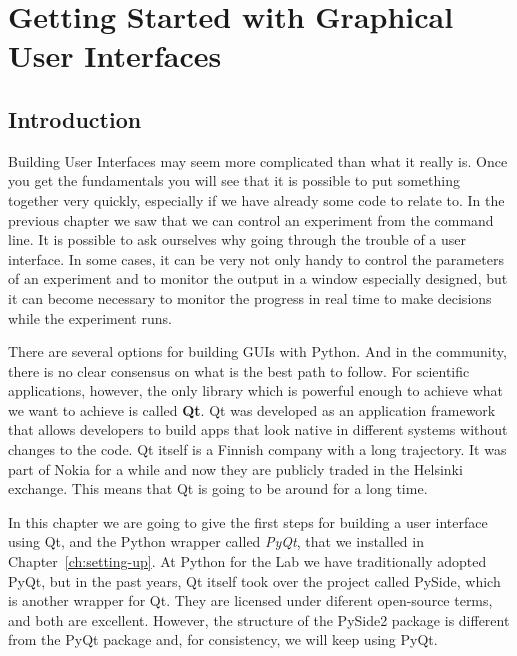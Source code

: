 \chapter{Getting Started with Graphical User Interfaces}\label{ch:gui}

\section{Introduction}\label{sec:gui-introduction}
Building User Interfaces may seem more complicated than what it really is. Once you get the fundamentals you will see that it is possible to put something together very quickly, especially if we have already some code to relate to. In the previous chapter we saw that we can control an experiment from the command line. It is possible to ask ourselves why going through the trouble of a user interface. In some cases, it can be very not only handy to control the parameters of an experiment and to monitor the output in a window especially designed, but it can become necessary to monitor the progress in real time to make decisions while the experiment runs.

There are several options for building GUIs with Python. And in the community, there is no clear consensus on what is the best path to follow. For scientific applications, however, the only library which is powerful enough to achieve what we want to achieve is called \textbf{Qt}. Qt was developed as an application framework that allows developers to build apps that look native in different systems without changes to the code. Qt itself is a Finnish company with a long trajectory. It was part of Nokia for a while and now they are publicly traded in the Helsinki exchange. This means that Qt is going to be around for a long time.

In this chapter we are going to give the first steps for building a user interface using Qt, and the Python wrapper called \emph{PyQt}, that we installed in Chapter~\ref{ch:setting-up}. At Python for the Lab we have traditionally adopted PyQt, but in the past years, Qt itself took over the project called PySide, which is another wrapper for Qt. They are licensed under diferent open-source terms, and both are excellent. However, the structure of the PySide2 package is different from the PyQt package and, for consistency, we will keep using PyQt.



